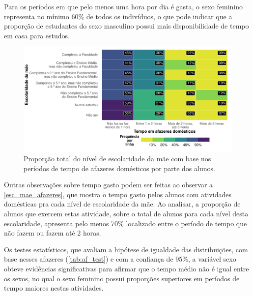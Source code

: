 Para os períodos em que pelo menos uma hora por dia é gasta, o sexo feminino
representa no mínimo 60\% de todos os indivíduos, o que pode indicar que a proporção 
de estudantes do sexo masculino possui mais disponibilidade de tempo em casa para estudos.

\begin{figure}[h]
    \caption{Proporção total do nível de escolaridade da mãe
    com base nos períodos de tempo de afazeres domésticos por parte dos alunos.\label{esc_mae_afazeres}}
    \begin{center}
        \includegraphics[width=16cm]{img/esc_mae_afazeres.pdf}
    \end{center}
\end{figure}

Outras observações sobre tempo gasto podem ser feitas ao observar a \autoref{esc_mae_afazeres},
que mostra o tempo gasto pelos alunos com atividades domésticas pra cada nível de escolaridade da mãe.
Ao analisar, a proporção de alunos que exercem estas atividade, sobre o total de alunos para cada nível
desta escolaridade, apresenta pelo menos 70\% localizado entre o período de tempo que 
não fazem ou fazem até 2 horas.

Os testes estatísticos, que avaliam a hipótese de igualdade das distribuições, com base nesses afazeres (\autoref{tab:af_test}) e com a
confiança de 95\%, a variável sexo obteve evidências significativas para afirmar que o tempo
médio não é igual entre os sexos, no qual o sexo feminino possui
proporções superiores em períodos de tempo maiores nestas atividades.


